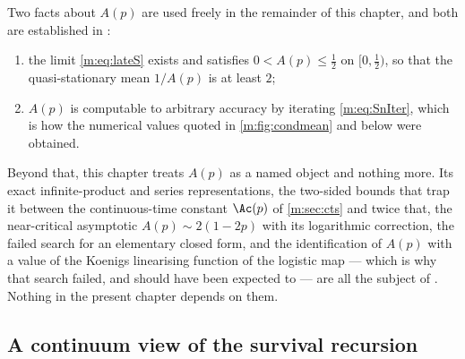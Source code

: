 Two facts about $A(p)$ are used freely in the remainder of this chapter, and both
are established in \ChA:
\begin{enumerate}[label=(\roman*)]
\item the limit \cref{m:eq:lateS} exists and satisfies $0<A(p)\le\tfrac12$ on
      $[0,\tfrac12)$, so that the quasi-stationary mean $1/A(p)$ is at least $2$;
\item $A(p)$ is computable to arbitrary accuracy by iterating \cref{m:eq:SnIter},
      which is how the numerical values quoted in \cref{m:fig:condmean} and below
      were obtained.
\end{enumerate}
Beyond that, this chapter treats $A(p)$ as a named object and nothing more. Its
exact infinite-product and series representations, the two-sided bounds that trap
it between the continuous-time constant $\Ac(p)$ of \cref{m:sec:cts} and twice
that, the near-critical asymptotic $A(p)\sim2(1-2p)$ with its logarithmic
correction, the failed search for an elementary closed form, and the identification
of $A(p)$ with a value of the Koenigs linearising function of the logistic map ---
which is why that search failed, and should have been expected to --- are all the
subject of \ChA. Nothing in the present chapter depends on them.

\subsection{A continuum view of the survival recursion}
\label{m:sec:riccati}

